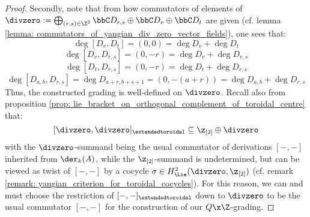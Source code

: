 \begin{proof}
                Secondly, note that from how commutators of elements of $\divzero := \bigoplus_{(r, s) \in \Z^2} \bbC D_{r, s} \oplus \bbC D_v \oplus \bbC D_t$ are given (cf. lemma \ref{lemma: commutators_of_yangian_div_zero_vector_fields}), one sees that:
                    $$\deg [D_v, D_t] = (0, 0) = \deg D_v + \deg D_t$$
                    $$\deg [D_v, D_{r, s}] = (0, -r) = \deg D_v + \deg D_{r, s}$$
                    $$\deg [D_t, D_{r, s}] = (0, -r) = \deg D_t + \deg D_{r, s}$$
                    $$\deg [D_{a, b}, D_{r, s}] = \deg D_{a + r, b + s + 1} = (0, -(a + r)) = \deg D_{a, b} + \deg D_{r, s}$$
                Thus, the constructed grading is well-defined on $\divzero$. Recall also from proposition \ref{prop: lie_bracket_on_orthogonal_complement_of_toroidal_centre} that:
                    $$[\divzero, \divzero]_{\extendedtoroidal} \subseteq \z_{[2]} \oplus \divzero$$
                with the $\divzero$-summand being the usual commutator of derivations $[-, -]$ inherited from $\der_{k}(A)$, while the $\z_{[2]}$-summand is undetermined, but can be viewed as twist of $[-, -]$ by a cocycle $\sigma \in H^2_{\Lie}(\divzero, \z_{[2]})$ (cf. remark \ref{remark: yangian_criterion_for_toroidal_cocycles}). For this reason, we can and must choose the restriction of $[-, -]_{\extendedtoroidal}$ down to $\divzero$ to be the usual commutator $[-, -]$ for the construction of our $Q \x \Z$-grading. 
            \end{proof}

